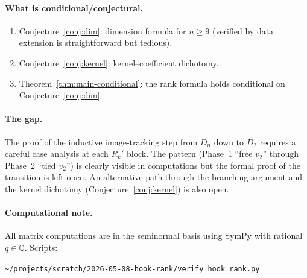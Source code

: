 \documentclass[11pt]{article}
\theoremstyle{definition}
\begin{document}
\paragraph{What is conditional/conjectural.}
\begin{enumerate}[leftmargin=2em,topsep=0.3em,itemsep=0.2em]
\item Conjecture~\ref{conj:dim}: dimension formula for $n\ge 9$
(verified by data extension is straightforward but tedious).
\item Conjecture~\ref{conj:kernel}: kernel--coefficient dichotomy.
\item Theorem~\ref{thm:main-conditional}: the rank formula holds
conditional on Conjecture~\ref{conj:dim}.
\end{enumerate}

\paragraph{The gap.}
The proof of the inductive image-tracking step from $D_n$ down
to $D_2$ requires a careful case analysis at each $R_k'$ block.
The pattern (Phase~1 ``free $v_2$'' through Phase~2 ``tied $v_2$'')
is clearly visible in computations but the formal proof of
the transition is left open. An alternative path through the
branching argument and the kernel dichotomy
(Conjecture~\ref{conj:kernel}) is also open.

\paragraph{Computational note.}
All matrix computations are in the seminormal basis using SymPy
with rational $q\in\mathbb{Q}$. Scripts:
\begin{center}
\texttt{\textasciitilde/projects/scratch/2026-05-08-hook-rank/verify\_hook\_rank.py}.
\end{center}
\end{document}
